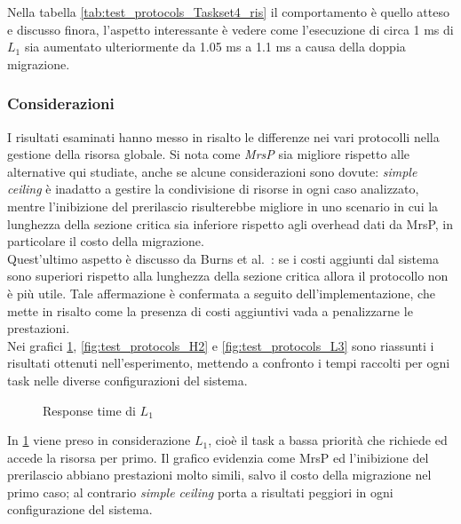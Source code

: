 \noindent Nella tabella \ref{tab:test_protocols_Taskset4_ris} il comportamento è quello atteso e discusso finora, l'aspetto interessante è vedere come l'esecuzione di circa 1 ms di $L_1$ sia aumentato ulteriormente da 1.05 ms a 1.1 ms a causa della doppia migrazione.

\subsubsection{Considerazioni}
\label{sec:confronto_protocolli_cons}

\noindent I risultati esaminati hanno messo in risalto le differenze nei vari protocolli nella gestione della risorsa globale. Si nota come \textit{MrsP} sia migliore rispetto alle alternative qui studiate, anche se alcune considerazioni sono dovute: \textit{simple ceiling} è inadatto a gestire la condivisione di risorse in ogni caso analizzato, mentre l'inibizione del prerilascio risulterebbe migliore in uno scenario in cui la lunghezza della sezione critica sia inferiore rispetto agli overhead dati da MrsP, in particolare il costo della migrazione.\\

\noindent Quest'ultimo aspetto è discusso da Burns et al.~\cite{Burns:2013:SCM:2547348.2547350}: se i costi aggiunti dal sistema sono superiori rispetto alla lunghezza della sezione critica allora il protocollo non è più utile. Tale affermazione è confermata a seguito dell'implementazione, che mette in risalto come la presenza di costi aggiuntivi vada a penalizzarne le prestazioni.\\

\noindent Nei grafici \ref{fig:test_protocols_L1}, \ref{fig:test_protocols_H2} e \ref{fig:test_protocols_L3} sono riassunti i risultati ottenuti nell'esperimento, mettendo a confronto i tempi raccolti per ogni task nelle diverse configurazioni del sistema.\\

\begin{figure}
  \centering
  \confrontoProtocolliLUno
  \caption{Response time di $L_1$}
  \label{fig:test_protocols_L1}
\end{figure}

\noindent In \ref{fig:test_protocols_L1} viene preso in considerazione $L_1$, cioè il task a bassa priorità che richiede ed accede la risorsa per primo. Il grafico evidenzia come MrsP ed l'inibizione del prerilascio abbiano prestazioni molto simili, salvo il costo della migrazione nel primo caso; al contrario \textit{simple ceiling} porta a risultati peggiori in ogni configurazione del sistema.\\

